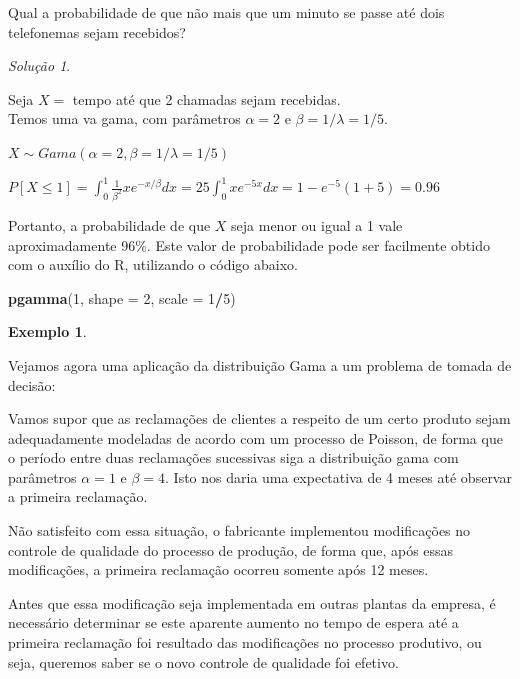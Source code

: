 \documentclass[
]{book}
\newenvironment{Shaded}{\begin{snugshade}}{\end{snugshade}}
\newcommand{\DataTypeTok}[1]{\textcolor[rgb]{0.13,0.29,0.53}{#1}}
\newcommand{\DecValTok}[1]{\textcolor[rgb]{0.00,0.00,0.81}{#1}}
\newcommand{\KeywordTok}[1]{\textcolor[rgb]{0.13,0.29,0.53}{\textbf{#1}}}
\newcommand{\NormalTok}[1]{#1}
\newcommand{\OperatorTok}[1]{\textcolor[rgb]{0.81,0.36,0.00}{\textbf{#1}}}
\theoremstyle{definition}
\theoremstyle{definition}
\newtheorem{example}{Exemplo}[chapter]
\theoremstyle{definition}
\theoremstyle{remark}
\newtheorem*{solution}{Solução}
\begin{document}
Qual a probabilidade de que não mais que um minuto se passe até dois telefonemas sejam recebidos?

\begin{solution}
{}
\end{solution}

Seja \(X=\) tempo até que 2 chamadas sejam recebidas.\\
Temos uma va gama, com parâmetros \(\alpha = 2\) e \(\beta = 1/\lambda = 1/5\).

\(X \sim Gama(\alpha = 2, \beta = 1/\lambda = 1/5)\)

\(P[X \leq 1] = \int_{0}^{1} \frac{1}{\beta^2}x e^{-x/\beta} dx = 25 \int_{0}^{1} x e^{-5x} dx = 1 - e^{-5}(1+5) = 0.96\)

Portanto, a probabilidade de que \(X\) seja menor ou igual a 1 vale aproximadamente 96\%. Este valor de probabilidade pode ser facilmente obtido com o auxílio do R, utilizando o código abaixo.

\begin{Shaded}
\begin{Highlighting}[]
\KeywordTok{pgamma}\NormalTok{(}\DecValTok{1}\NormalTok{, }\DataTypeTok{shape =} \DecValTok{2}\NormalTok{, }\DataTypeTok{scale =} \DecValTok{1}\OperatorTok{/}\DecValTok{5}\NormalTok{)}
\end{Highlighting}
\end{Shaded}

\begin{example}
\protect\hypertarget{exm:unnamed-chunk-12}{}{\label{exm:unnamed-chunk-12} }
\end{example}

Vejamos agora uma aplicação da distribuição Gama a um problema de tomada de decisão:

Vamos supor que as reclamações de clientes a respeito de um certo produto sejam adequadamente modeladas de acordo com um processo de Poisson, de forma que o período entre duas reclamações sucessivas siga a distribuição gama com parâmetros \(\alpha = 1\) e \(\beta = 4\). Isto nos daria uma expectativa de 4 meses até observar a primeira reclamação.

Não satisfeito com essa situação, o fabricante implementou modificações no controle de qualidade do processo de produção, de forma que, após essas modificações, a primeira reclamação ocorreu somente após 12 meses.

Antes que essa modificação seja implementada em outras plantas da empresa, é necessário determinar se este aparente aumento no tempo de espera até a primeira reclamação foi resultado das modificações no processo produtivo, ou seja, queremos saber se o novo controle de qualidade foi efetivo.
\end{document}
